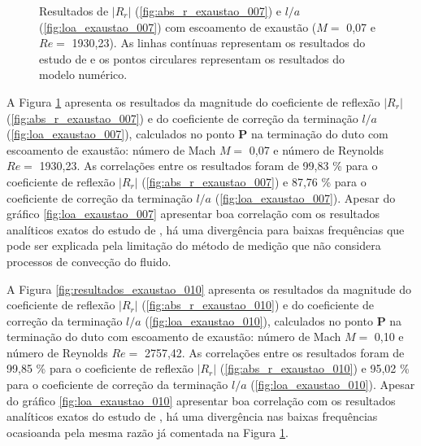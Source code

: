 \newpage
\begin{figure}[ht!]
\begin{subfigure}{\scaleA \textwidth}
  
\end{subfigure}%
\begin{subfigure}{\scaleA \textwidth}
  
\end{subfigure}
\caption[Resultados de $|R_{r}|$ e $l/a$ com escoamento de exaustão ($M =$ 0,07 e $Re =$ 1930,23)]{Resultados de $|R_{r}|$ (\ref{fig:abs_r_exaustao_007}) e $l/a$ (\ref{fig:loa_exaustao_007}) com escoamento de exaustão ($M =$ 0,07 e $Re =$ 1930,23). As linhas contínuas representam os resultados do estudo de  e os pontos circulares representam os resultados do modelo numérico.}
\label{fig:resultados_exaustao_007}
\end{figure}

A Figura \ref{fig:resultados_exaustao_007} apresenta os resultados da magnitude do coeficiente de reflexão $|R_{r}|$ (\ref{fig:abs_r_exaustao_007}) e do coeficiente de correção da terminação $l/a$ (\ref{fig:loa_exaustao_007}), calculados no ponto $\textbf{P}$ na terminação do duto com escoamento de exaustão: número de Mach $M =$ 0,07 e número de Reynolds $Re =$ 1930,23.  As correlações entre os resultados foram de 99,83 \% para o coeficiente de reflexão $|R_{r}|$ (\ref{fig:abs_r_exaustao_007}) e 87,76 \% para o coeficiente de correção da terminação $l/a$ (\ref{fig:loa_exaustao_007}). Apesar do gráfico \ref{fig:loa_exaustao_007} apresentar boa correlação com os resultados analíticos exatos do estudo de , há uma divergência para baixas frequências que pode ser explicada pela limitação do método de medição que não considera processos de convecção do fluido.  

A Figura \ref{fig:resultados_exaustao_010} apresenta os resultados da magnitude do coeficiente de reflexão $|R_{r}|$ (\ref{fig:abs_r_exaustao_010}) e do coeficiente de correção da terminação $l/a$ (\ref{fig:loa_exaustao_010}), calculados no ponto $\textbf{P}$ na terminação do duto com escoamento de exaustão: número de Mach $M =$ 0,10 e número de Reynolds $Re =$ 2757,42.  As correlações entre os resultados foram de 99,85 \% para o coeficiente de reflexão $|R_{r}|$ (\ref{fig:abs_r_exaustao_010}) e 95,02 \% para o coeficiente de correção da terminação $l/a$ (\ref{fig:loa_exaustao_010}). Apesar do gráfico \ref{fig:loa_exaustao_010} apresentar boa correlação com os resultados analíticos exatos do estudo de , há uma divergência nas baixas frequências ocasioanda pela mesma razão já comentada na Figura \ref{fig:resultados_exaustao_007}.

